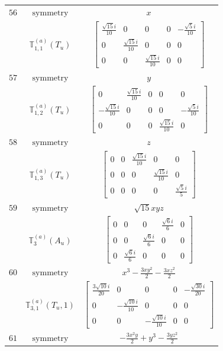 \documentclass[fleqn,8pt,landscape]{jsarticle}
\begin{document}
\begin{longtable}{ccc}
$ 56 $ & $ \text{symmetry} $ & $ x $ \\
$  $ & $ \mathbb{T}_{1,1}^{(a)}(T_{u}) $ & $ \begin{bmatrix} \frac{\sqrt{15} i}{10} & 0 & 0 & 0 & - \frac{\sqrt{5} i}{10} \\ 0 & \frac{\sqrt{15} i}{10} & 0 & 0 & 0 \\ 0 & 0 & \frac{\sqrt{15} i}{10} & 0 & 0 \end{bmatrix} $ \\ \hline
$ 57 $ & $ \text{symmetry} $ & $ y $ \\
$  $ & $ \mathbb{T}_{1,2}^{(a)}(T_{u}) $ & $ \begin{bmatrix} 0 & \frac{\sqrt{15} i}{10} & 0 & 0 & 0 \\ - \frac{\sqrt{15} i}{10} & 0 & 0 & 0 & - \frac{\sqrt{5} i}{10} \\ 0 & 0 & 0 & \frac{\sqrt{15} i}{10} & 0 \end{bmatrix} $ \\ \hline
$ 58 $ & $ \text{symmetry} $ & $ z $ \\
$  $ & $ \mathbb{T}_{1,3}^{(a)}(T_{u}) $ & $ \begin{bmatrix} 0 & 0 & \frac{\sqrt{15} i}{10} & 0 & 0 \\ 0 & 0 & 0 & \frac{\sqrt{15} i}{10} & 0 \\ 0 & 0 & 0 & 0 & \frac{\sqrt{5} i}{5} \end{bmatrix} $ \\ \hline
$ 59 $ & $ \text{symmetry} $ & $ \sqrt{15} x y z $ \\
$  $ & $ \mathbb{T}_{3}^{(a)}(A_{u}) $ & $ \begin{bmatrix} 0 & 0 & 0 & \frac{\sqrt{6} i}{6} & 0 \\ 0 & 0 & \frac{\sqrt{6} i}{6} & 0 & 0 \\ 0 & \frac{\sqrt{6} i}{6} & 0 & 0 & 0 \end{bmatrix} $ \\ \hline
$ 60 $ & $ \text{symmetry} $ & $ x^{3} - \frac{3 x y^{2}}{2} - \frac{3 x z^{2}}{2} $ \\
$  $ & $ \mathbb{T}_{3,1}^{(a)}(T_{u},1) $ & $ \begin{bmatrix} \frac{3 \sqrt{10} i}{20} & 0 & 0 & 0 & - \frac{\sqrt{30} i}{20} \\ 0 & - \frac{\sqrt{10} i}{10} & 0 & 0 & 0 \\ 0 & 0 & - \frac{\sqrt{10} i}{10} & 0 & 0 \end{bmatrix} $ \\ \hline
$ 61 $ & $ \text{symmetry} $ & $ - \frac{3 x^{2} y}{2} + y^{3} - \frac{3 y z^{2}}{2} $ \\

\end{longtable}
\end{document}
